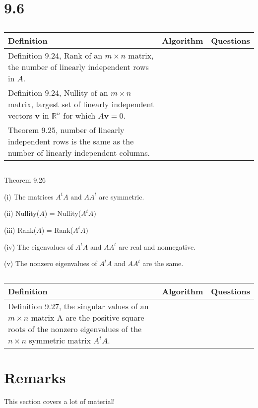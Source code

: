 \documentclass{article}
\begin{document}
\section*{9.6}

\subsection*{}

\begin{tabularx}{\textwidth}{ |X|c|c| }
    \hline
	{\bf Definition} & {\bf Algorithm} & {\bf Questions} \\
    \hline
	Definition 9.24, Rank of an $m \times n$ matrix, the number of linearly independent rows in $A$. & & \\
    \hline
	Definition 9.24, Nullity of an $m \times n$ matrix, largest set of linearly independent vectors $\boldsymbol{v}$ in $\mathbb{R}^n$ for which $A \boldsymbol{v}=0$. & & \\
    \hline
	Theorem 9.25, number of linearly independent rows is the same as the number of linearly independent columns. & & \\
    \hline
\end{tabularx}

\subsection*{}

Theorem 9.26

(i) The matrices $A^tA$ and $AA^t$ are symmetric.

(ii) Nullity($A$) = Nullity($A^tA)$

(iii) Rank($A$) = Rank($A^tA)$

(iv) The eigenvalues of $A^tA$ and $AA^t$ are real and nonnegative.

(v) The nonzero eigenvalues of $A^tA$ and $AA^t$ are the same.

\subsection*{}

\begin{tabularx}{\textwidth}{ |X|c|c| }
    \hline
	{\bf Definition} & {\bf Algorithm} & {\bf Questions} \\
    \hline
	Definition 9.27, the singular values of an $m \times n$ matrix A are the positive square roots of the nonzero eigenvalues of the $n \times n$ symmetric matrix $A^tA$. & & \\
    \hline
\end{tabularx}

\section*{Remarks}

This section covers a lot of material!
\end{document}
